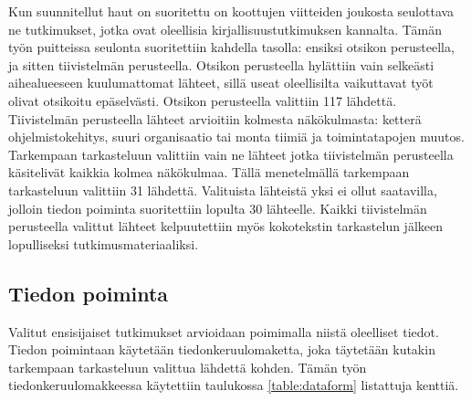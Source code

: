 Kun suunnitellut haut on suoritettu on koottujen viitteiden joukosta seulottava
ne tutkimukset, jotka ovat oleellisia kirjallisuustutkimuksen kannalta. Tämän
työn puitteissa seulonta suoritettiin kahdella tasolla: ensiksi otsikon
perusteella, ja sitten tiivistelmän perusteella. Otsikon perusteella hylättiin
vain selkeästi aihealueeseen kuulumattomat lähteet, sillä useat oleellisilta
vaikuttavat työt olivat otsikoitu epäselvästi. Otsikon perusteella valittiin 117
lähdettä. Tiivistelmän perusteella lähteet arvioitiin kolmesta näkökulmasta:
ketterä ohjelmistokehitys, suuri organisaatio tai monta tiimiä ja
toimintatapojen muutos. Tarkempaan tarkasteluun valittiin vain ne lähteet jotka
tiivistelmän perusteella käsitelivät kaikkia kolmea näkökulmaa. Tällä
menetelmällä tarkempaan tarkasteluun valittiin 31 lähdettä. Valituista lähteistä
yksi ei ollut saatavilla, jolloin tiedon poiminta suoritettiin lopulta 30
lähteelle. Kaikki tiivistelmän perusteella valittut lähteet kelpuutettiin
myös kokotekstin tarkastelun jälkeen lopulliseksi tutkimusmateriaaliksi.


\subsection{Tiedon poiminta}

Valitut ensisijaiset tutkimukset arvioidaan poimimalla niistä oleelliset tiedot.
Tiedon poimintaan käytetään tiedonkeruulomaketta, joka täytetään kutakin
tarkempaan tarkasteluun valittua lähdettä kohden. Tämän työn
tiedonkeruulomakkeessa käytettiin taulukossa \ref{table:dataform} listattuja
kenttiä.


